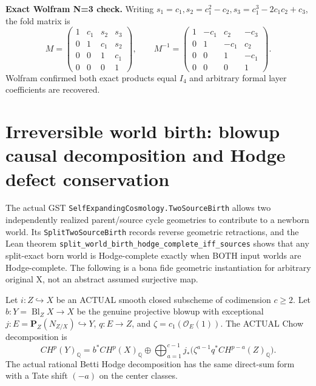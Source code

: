 \documentclass[11pt]{article}
\newcommand{\Q}{\mathbb Q}
\begin{document}
\noindent\textbf{Exact Wolfram N=3 check.}
Writing \(s_1=c_1,s_2=c_1^2-c_2,
s_3=c_1^3-2c_1c_2+c_3\), the fold matrix is
\[
 M=\begin{pmatrix}
 1&c_1&s_2&s_3\\0&1&c_1&s_2\\
 0&0&1&c_1\\0&0&0&1
 \end{pmatrix},\qquad
 M^{-1}=\begin{pmatrix}
 1&-c_1&c_2&-c_3\\
 0&1&-c_1&c_2\\0&0&1&-c_1\\0&0&0&1
 \end{pmatrix}.
\]
Wolfram confirmed both exact products equal \(I_4\)
and arbitrary formal layer coefficients are recovered.

\section{Irreversible world birth: blowup causal decomposition and Hodge defect conservation}
The actual GST
\texttt{SelfExpandingCosmology.TwoSourceBirth}
allows two independently
realized parent/source cycle geometries to
contribute to a newborn world.
Its \texttt{SplitTwoSourceBirth} records
reverse geometric retractions, and the Lean theorem
\texttt{split_world_birth_hodge_complete_iff_sources}
shows that any split-exact born world is Hodge-complete
exactly when BOTH input worlds are Hodge-complete.
The following is a bona fide geometric instantiation
for arbitrary original X, not an abstract assumed
surjective map.

Let \(i:Z\hookrightarrow X\) be an ACTUAL smooth
closed subscheme of codimension \(c\ge2\).
Let \(b:Y=\operatorname{Bl}_Z X\to X\)
be the genuine projective blowup with exceptional
\(j:E=\mathbf P_Z(N_{Z/X})\hookrightarrow Y\),
\(q:E\to Z\), and
\(\zeta=c_1(\mathcal O_E(1))\).
The ACTUAL Chow decomposition is
\[
 \boxed{
 CH^p(Y)_\Q =
 b^*CH^p(X)_\Q
 \oplus
 \bigoplus_{a=1}^{c-1}
 j_*\bigl(\zeta^{a-1}q^*CH^{p-a}(Z)_\Q\bigr).
 }                                                        \tag{4a}
\]
The actual rational Betti Hodge decomposition has
the same direct-sum form with a
Tate shift \((-a)\) on the center classes.
\end{document}

